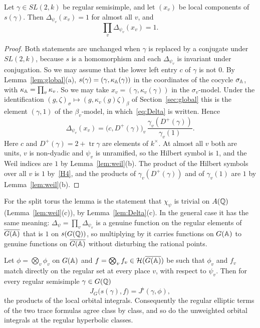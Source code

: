 \begin{lemma}\label{lem:Delta-product}
Let $\gamma\in SL(2,k)$ be regular semisimple, and let $(x_v)$ be local
components of $s(\gamma)$. Then $\Delta_{\psi_v}(x_v)=1$ for almost all
$v$, and
\[
\prod_v\Delta_{\psi_v}(x_v)=1 .
\]
\end{lemma}

\begin{proof}
Both statements are unchanged when $\gamma$ is replaced by a conjugate
under $SL(2,k)$, because $s$ is a homomorphism and each $\Delta_{\psi_v}$
is invariant under conjugation. So we may assume that the lower left
entry $c$ of $\gamma$ is not $0$. By Lemma~\ref{lem:global}(a),
$s(\gamma)=(\gamma,\kappa_{\mathbb{A}}(\gamma))$ in the coordinates of the cocycle
$\sigma_{\mathbb{A}}$, with $\kappa_{\mathbb{A}}=\prod_v\kappa_v$. So we may take $x_v=(\gamma,
\kappa_v(\gamma))$ in the $\sigma_v$-model. Under the identification
$(g,\zeta)_\sigma\mapsto(g,\kappa_v(g)\zeta)_\beta$ of
Section~\ref{sec:global} this is the element $(\gamma,1)$ of the
$\beta_v$-model, in which~\eqref{eq:Delta} is written. Hence
\[
\Delta_{\psi_v}(x_v)=\bigl(c,D^+(\gamma)\bigr)_v\,\frac{\gamma_v(D^+(\gamma))}
{\gamma_v(1)} .
\]
Here $c$ and $D^+(\gamma)=2+\operatorname{tr}\gamma$ are elements of
$k^\times$. At almost all $v$ both are units, $v$ is non-dyadic and
$\psi_v$ is unramified, so the Hilbert symbol is $1$, and the Weil
indices are $1$ by Lemma~\ref{lem:weil}(b). The product of the Hilbert
symbols over all $v$ is $1$ by~\ref{H4}, and the products of
$\gamma_v(D^+(\gamma))$ and of $\gamma_v(1)$ are $1$ by
Lemma~\ref{lem:weil}(b).
\end{proof}

For the split torus the lemma is the statement that $\chi_\psi$ is trivial
on $A(\mathbb{Q})$ (Lemma~\ref{lem:weil}(c)), by Lemma~\ref{lem:Delta}(c). In the
general case it has the same meaning: $\Delta_\psi=\prod_v\Delta_{\psi_v}$
is a genuine function on the regular elements of $\overline{G(\mathbb{A})}$ that is $1$ on
$s(G(\mathbb{Q}))$, so multiplying by it carries functions on $G(\mathbb{A})$ to genuine
functions on $\overline{G(\mathbb{A})}$ without disturbing the rational points.

\begin{corollary}\label{cor:coherent}
Let $\phi=\bigotimes_v\phi_v$ on $G(\mathbb{A})$ and $f=\bigotimes_vf_v\in
\mathcal H(\overline{G(\mathbb{A})})$ be such that $\phi_v$ and $f_v$ match directly on the
regular set at every place $v$, with respect to $\psi_v$. Then for every
regular semisimple $\gamma\in G(\mathbb{Q})$
\[
J_G\bigl(s(\gamma),f\bigr)=J^\flat(\gamma,\phi),
\]
the products of the local orbital integrals. Consequently the regular
elliptic terms of the two trace formulas agree class by class, and so do
the unweighted orbital integrals at the regular hyperbolic classes.
\end{corollary}

